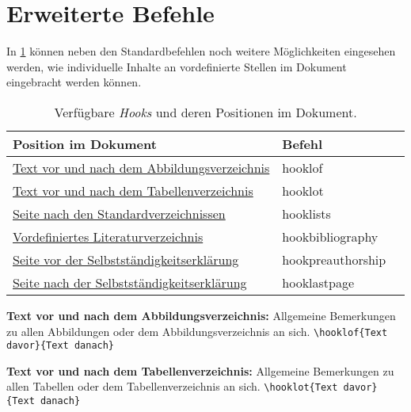 \documentclass[
%
	thesis=paper,		%
	compactlistof,		%
	noauthorship,		%
%
	fancy,				%
%
%
]{hsmw-thesis}
\begin{document}
	\section{Erweiterte Befehle}
	
	In \cref{tab:hooks} können neben den Standardbefehlen noch weitere Möglichkeiten eingesehen werden, wie individuelle Inhalte an vordefinierte Stellen im Dokument eingebracht werden können.
	
	\begin{table}[!htb]
		\centering
		\caption{Verfügbare \textit{Hooks} und deren Positionen im Dokument.}
		\label{tab:hooks}
		\begin{tabular}{lll}
			\toprule
			\textbf{Position im Dokument} & \textbf{Befehl} \\
			\midrule
			\hyperref[cmd:hooklof]{Text vor und nach dem Abbildungsverzeichnis} & hooklof \\
			\hyperref[cmd:hooklot]{Text vor und nach dem Tabellenverzeichnis} & hooklot \\
			\hyperref[cmd:hooklists]{Seite nach den Standardverzeichnissen} & hooklists \\
			\hyperref[cmd:hookbibliography]{Vordefiniertes Literaturverzeichnis} & hookbibliography \\
			\hyperref[cmd:hookpreauthorship]{Seite vor der Selbstständigkeitserklärung} & hookpreauthorship \\
			\hyperref[cmd:hooklastpage]{Seite nach der Selbstständigkeitserklärung} & hooklastpage \\	
			\bottomrule
		\end{tabular}
	\end{table}
	
	\textbf{Text vor und nach dem Abbildungsverzeichnis:}\label{cmd:hooklof}
	Allgemeine Bemerkungen zu allen Abbildungen oder dem Abbildungsverzeichnis an sich.
	\newline
	\verb|\hooklof{Text davor}{Text danach}|
	
	\textbf{Text vor und nach dem Tabellenverzeichnis:}\label{cmd:hooklot}
	Allgemeine Bemerkungen zu allen Tabellen oder dem Tabellenverzeichnis an sich.
	\newline
	\verb|\hooklot{Text davor}{Text danach}|
	
\end{document}
